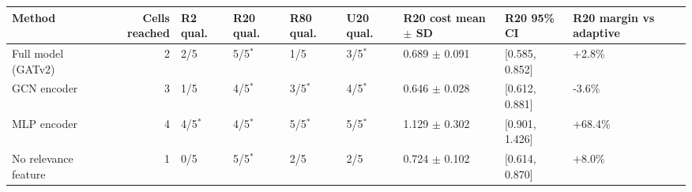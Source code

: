 \begin{tabular}{lrlllllll}
\hline
Method & Cells reached & R2 qual. & R20 qual. & R80 qual. & U20 qual. & R20 cost mean $\pm$ SD & R20 95\% CI & R20 margin vs adaptive \\
\hline
Full model (GATv2) & 2 & 2/5 & 5/5$^\ast$ & 1/5 & 3/5$^\ast$ & 0.689 $\pm$ 0.091 & [0.585, 0.852] & +2.8\% \\
GCN encoder & 3 & 1/5 & 4/5$^\ast$ & 3/5$^\ast$ & 4/5$^\ast$ & 0.646 $\pm$ 0.028 & [0.612, 0.881] & -3.6\% \\
MLP encoder & 4 & 4/5$^\ast$ & 4/5$^\ast$ & 5/5$^\ast$ & 5/5$^\ast$ & 1.129 $\pm$ 0.302 & [0.901, 1.426] & +68.4\% \\
No relevance feature & 1 & 0/5 & 5/5$^\ast$ & 2/5 & 2/5 & 0.724 $\pm$ 0.102 & [0.614, 0.870] & +8.0\% \\
\hline
\end{tabular}
